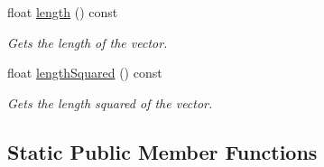 \begin{DoxyCompactItemize}
float \hyperlink{classflounder_1_1vector2_af91b7aff4d835eef17da4ae9aa715058}{length} () const
\begin{DoxyCompactList}\small\item\em Gets the length of the vector. \end{DoxyCompactList}\item 
float \hyperlink{classflounder_1_1vector2_a1ba7dc651130977773db243dcd02be3f}{length\+Squared} () const
\begin{DoxyCompactList}\small\item\em Gets the length squared of the vector. \end{DoxyCompactList}\end{DoxyCompactItemize}
\subsection*{Static Public Member Functions}

